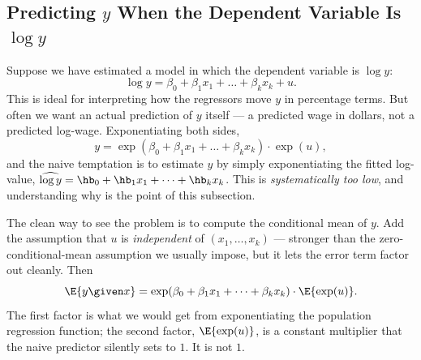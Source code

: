 
\subsection{Predicting \texorpdfstring{$y$}{y} When the Dependent Variable Is \texorpdfstring{$\log y$}{log y}}
\label{sec:logy-prediction}

Suppose we have estimated a model in which the dependent variable is $\log y$:
\[
\log y = \beta_0 + \beta_1 x_1 + \dots + \beta_k x_k + u .
\]
This is ideal for interpreting how the regressors move $y$ in percentage terms. But often we want an actual prediction of $y$ itself --- a predicted wage in dollars, not a predicted log-wage. Exponentiating both sides,
\[
y = \exp(\beta_0 + \beta_1 x_1 + \dots + \beta_k x_k)\cdot \exp(u),
\]
and the naive temptation is to estimate $y$ by simply exponentiating the fitted log-value, $\widehat{\log y} = \hb_0 + \hb_1 x_1 + \dots + \hb_k x_k$. This is \emph{systematically too low}, and understanding why is the point of this subsection.

The clean way to see the problem is to compute the conditional mean of $y$. Add the assumption that $u$ is \emph{independent} of $(x_1,\dots,x_k)$ --- stronger than the zero-conditional-mean assumption we usually impose, but it lets the error term factor out cleanly. Then
\[
\E{y \given x} = \exp(\beta_0 + \beta_1 x_1 + \dots + \beta_k x_k)\cdot \E{\exp(u)} .
\]
The first factor is what we would get from exponentiating the population regression function; the second factor, $\E{\exp(u)}$, is a constant multiplier that the naive predictor silently sets to $1$. It is not $1$.

